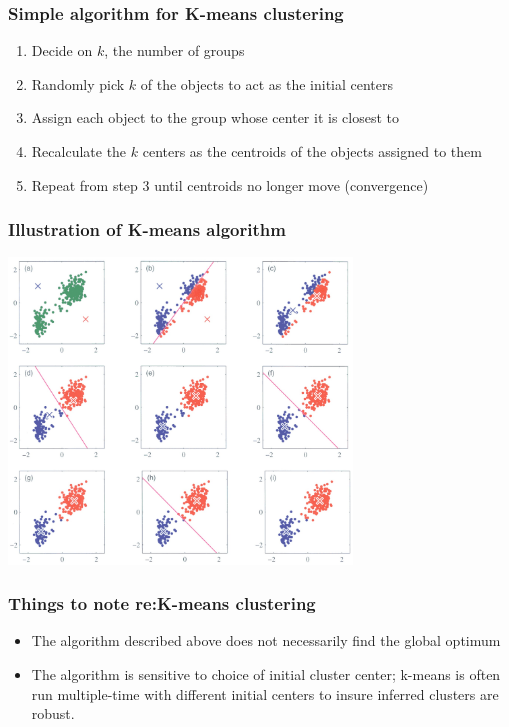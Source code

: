 \documentclass{beamer}
\begin{document}
\begin{frame}
\frametitle{Simple algorithm for K-means clustering}

\begin{enumerate}
\item Decide on $k$, the number of groups

\item Randomly pick $k$ of the objects to act as the initial centers

\item Assign each object to the group whose center it is closest to

\item Recalculate the $k$ centers as the centroids of the objects assigned to them

\item Repeat from step 3 until centroids no longer move (convergence)

\end{enumerate}

\end{frame}

\begin{frame}
\frametitle{Illustration of K-means algorithm}
\begin{center}
\includegraphics[height=3.2in]{k-means-fig.jpg}    
\end{center}
\end{frame}

\begin{frame}
\frametitle{Things to note re:K-means clustering}
\begin{itemize}
\item The algorithm described above does not necessarily find the global optimum

\bigskip

\item The algorithm is sensitive to choice of initial cluster center; k-means is often run multiple-time with different initial centers to insure inferred clusters are robust.    
\end{itemize}
\end{frame}
\end{document}
